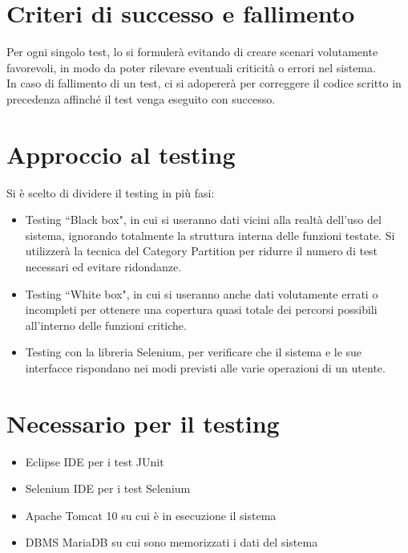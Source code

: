 \documentclass[12pt]{article}
\begin{document}
\section{Criteri di successo e fallimento}
Per ogni singolo test, lo si formulerà evitando di creare scenari volutamente favorevoli, in modo da poter rilevare eventuali criticità o errori nel sistema. \\
In caso di fallimento di un test, ci si adopererà per correggere il codice scritto in precedenza affinché il test venga eseguito con successo.

\section{Approccio al testing}
Si è scelto di dividere il testing in più fasi:

\begin{itemize}
\item Testing ``Black box", in cui si useranno dati vicini alla realtà dell'uso del sistema, ignorando totalmente la struttura interna delle funzioni testate. Si utilizzerà la tecnica del Category Partition per ridurre il numero di test necessari ed evitare ridondanze.

\item Testing ``White box", in cui si useranno anche dati volutamente errati o incompleti per ottenere una copertura quasi totale dei percorsi possibili all'interno delle funzioni critiche.

\item Testing con la libreria Selenium, per verificare che il sistema e le sue interfacce rispondano nei modi previsti alle varie operazioni di un utente.
\end{itemize}

\section{Necessario per il testing}
\begin{itemize}
\item Eclipse IDE per i test JUnit
\item Selenium IDE per i test Selenium
\item Apache Tomcat 10 su cui è in esecuzione il sistema
\item DBMS MariaDB su cui sono memorizzati i dati del sistema
\end{itemize}

\newpage
{}
\end{document}
